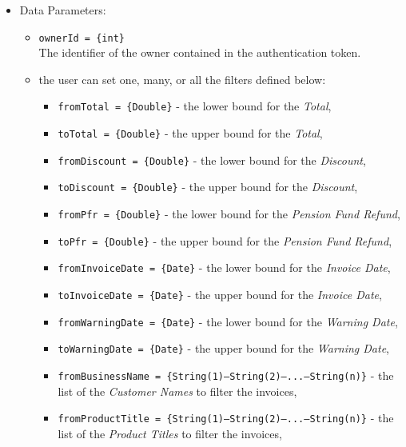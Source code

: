 \begin{itemize}
    \item Data Parameters:
    \begin{itemize}
        \item \texttt{ownerId = \{int\}} \\
        The identifier of the owner contained in the authentication token.
        \item the user can set one, many, or all the filters defined below:
        \begin{itemize}
            \item \texttt{fromTotal = \{Double\}} - the lower bound for the \textit{Total},
            \item \texttt{toTotal = \{Double\}} - the upper bound for the \textit{Total},
            \item \texttt{fromDiscount = \{Double\}} - the lower bound for the \textit{Discount},
            \item \texttt{toDiscount = \{Double\}} - the upper bound for the \textit{Discount},
            \item \texttt{fromPfr = \{Double\}} - the lower bound for the \textit{Pension Fund Refund},
            \item \texttt{toPfr = \{Double\}} - the upper bound for the \textit{Pension Fund Refund},
            \item \texttt{fromInvoiceDate = \{Date\}} - the lower bound for the \textit{Invoice Date},
            \item \texttt{toInvoiceDate = \{Date\}} - the upper bound for the \textit{Invoice Date},
            \item \texttt{fromWarningDate = \{Date\}} - the lower bound for the \textit{Warning Date},
            \item \texttt{toWarningDate = \{Date\}} - the upper bound for the \textit{Warning Date},
            \item \texttt{fromBusinessName = \{String(1)---String(2)---...---String(n)\}} - the list of the \textit{Customer Names} to filter the invoices,
            \item \texttt{fromProductTitle = \{String(1)---String(2)---...---String(n)\}} - the list of the \textit{Product Titles} to filter the invoices,
        \end{itemize}
    \end{itemize}


\end{itemize}
